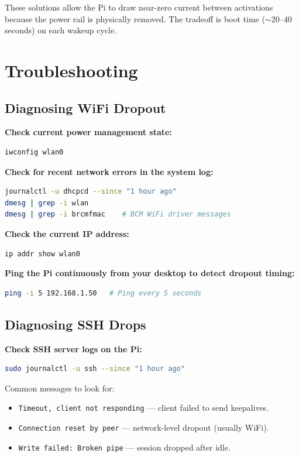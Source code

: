 \documentclass[11pt,letter]{article}
\begin{document}
These solutions allow the Pi to draw near-zero current between activations because the power rail is physically removed. The tradeoff is boot time ($\sim$20--40 seconds) on each wakeup cycle.

\section{Troubleshooting}

\subsection{Diagnosing WiFi Dropout}

\textbf{Check current power management state:}
\begin{lstlisting}[language=bash]
iwconfig wlan0
\end{lstlisting}

\textbf{Check for recent network errors in the system log:}
\begin{lstlisting}[language=bash]
journalctl -u dhcpcd --since "1 hour ago"
dmesg | grep -i wlan
dmesg | grep -i brcmfmac    # BCM WiFi driver messages
\end{lstlisting}

\textbf{Check the current IP address:}
\begin{lstlisting}[language=bash]
ip addr show wlan0
\end{lstlisting}

\textbf{Ping the Pi continuously from your desktop to detect dropout timing:}
\begin{lstlisting}[language=bash]
ping -i 5 192.168.1.50   # Ping every 5 seconds
\end{lstlisting}

\subsection{Diagnosing SSH Drops}

\textbf{Check SSH server logs on the Pi:}
\begin{lstlisting}[language=bash]
sudo journalctl -u ssh --since "1 hour ago"
\end{lstlisting}

Common messages to look for:
\begin{itemize}
  \item \texttt{Timeout, client not responding} --- client failed to send keepalives.
  \item \texttt{Connection reset by peer} --- network-level dropout (usually WiFi).
  \item \texttt{Write failed: Broken pipe} --- session dropped after idle.
\end{itemize}
\end{document}
